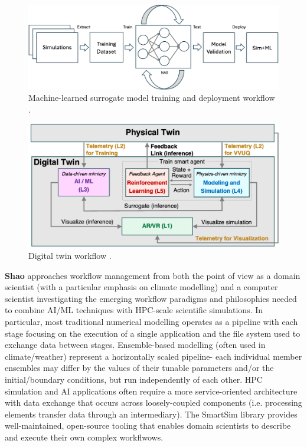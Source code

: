 \documentclass[utf8]{FrontiersinVancouver} %
\begin{document}
\begin{figure}
    \centering
    \includegraphics[width=0.8\linewidth]{images/workflow-surrogate-model.png}
    \caption{Machine-learned surrogate model training and deployment workflow \cite{brewer2023entropy}.}
    \label{fig:surrogate}
\end{figure}

\begin{figure}
    \centering
    \includegraphics[width=0.8\linewidth]{images/workflow-digital-twin.png}
    \caption{Digital twin workflow \cite{brewer2024digital}.}
    \label{fig:dt}
\end{figure}


{\bf Shao} approaches workflow management from both the point of view as a domain scientist (with a particular emphasis on climate modelling) and a computer scientist investigating the emerging workflow paradigms and philosophies needed to combine AI/ML techniques with HPC-scale scientific simulations. In particular, most traditional numerical modelling operates as a pipeline with each stage focusing on the execution of a single application and the file system used to exchange data between stages. Ensemble-based modelling (often used in climate/weather) represent a horizontally scaled pipeline- each individual member ensembles may differ by the values of their tunable parameters and/or the initial/boundary conditions, but run independently of each other. HPC simulation and AI applications often require a more service-oriented architecture with data exchange that occurs across loosely-coupled components (i.e. processing elements transfer data through an intermediary). The SmartSim library provides well-maintained, open-source tooling that enables domain scientists to describe and execute their own complex workflwows.
\end{document}
